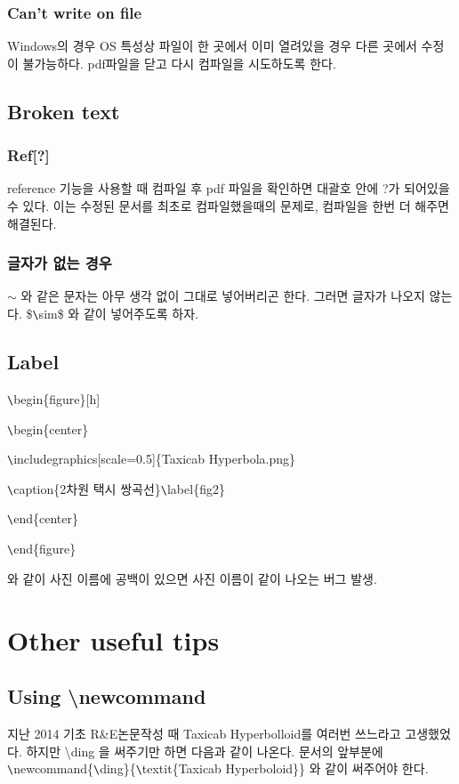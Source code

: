 \documentclass[11pt]{article}
\begin{document}
\subsubsection{Can't write on file}
Windows의 경우 OS 특성상 파일이 한 곳에서 이미 열려있을 경우 다른 곳에서 수정이 불가능하다.
pdf파일을 닫고 다시 컴파일을 시도하도록 한다.


\subsection{Broken text}
\subsubsection{Ref[?]}
reference 기능을 사용할 때 컴파일 후 pdf 파일을 확인하면 대괄호 안에 ?가 되어있을수 있다. 이는 수정된 문서를 최초로 컴파일했을때의 문제로, 컴파일을 한번 더 해주면 해결된다.
\subsubsection{글자가 없는 경우}
$\sim$ 와 같은 문자는 아무 생각 없이 그대로 넣어버리곤 한다. 그러면 글자가 나오지 않는다. 
\$\verb+\+sim\$ 와 같이 넣어주도록 하자.


\subsection{Label}
\verb+\+begin\{figure\}[h]

\verb+\+begin\{center\}

\verb+\+includegraphics[scale=0.5]\{Taxicab Hyperbola.png\} 

\verb+\+caption\{2차원 택시 쌍곡선\}\verb+\+label\{fig2\}

\verb+\+end\{center\}

\verb+\+end\{figure\}

와 같이 사진 이름에 공백이 있으면 사진 이름이 같이 나오는 버그 발생.

\section{Other useful tips}
\subsection{Using \textbackslash newcommand}
지난 2014 기초 R\&E논문작성 때 Taxicab Hyperbolloid를 여러번 쓰느라고 고생했었다.
하지만 \textbackslash ding 을 써주기만 하면 다음과 같이 나온다. 
문서의 앞부분에 \verb+\+newcommand\{\verb+\+ding\}\{\verb+\+textit\{Taxicab Hyperboloid\}\} 와 같이 써주어야 한다. 
\ding
\end{document}
